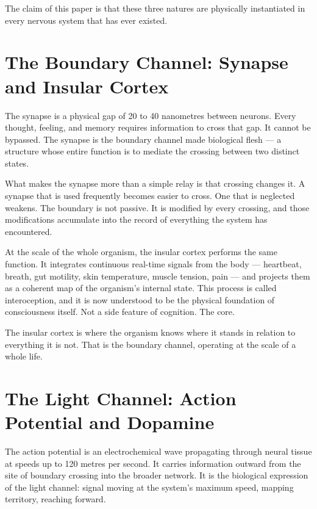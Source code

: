 \documentclass[12pt]{article}
\begin{document}
The claim of this paper is that these three natures are physically instantiated
in every nervous system that has ever existed.

\section{The Boundary Channel: Synapse and Insular Cortex}

The synapse is a physical gap of 20 to 40 nanometres between neurons. Every
thought, feeling, and memory requires information to cross that gap. It cannot
be bypassed. The synapse is the boundary channel made biological flesh --- a
structure whose entire function is to mediate the crossing between two distinct
states.

What makes the synapse more than a simple relay is that crossing changes it.
A synapse that is used frequently becomes easier to cross. One that is neglected
weakens. The boundary is not passive. It is modified by every crossing, and
those modifications accumulate into the record of everything the system has
encountered.

At the scale of the whole organism, the insular cortex performs the same
function. It integrates continuous real-time signals from the body --- heartbeat,
breath, gut motility, skin temperature, muscle tension, pain --- and projects
them as a coherent map of the organism's internal state. This process is called
interoception, and it is now understood to be the physical foundation of
consciousness itself. Not a side feature of cognition. The core.

The insular cortex is where the organism knows where it stands in relation to
everything it is not. That is the boundary channel, operating at the scale of a
whole life.

\section{The Light Channel: Action Potential and Dopamine}

The action potential is an electrochemical wave propagating through neural
tissue at speeds up to 120 metres per second. It carries information outward
from the site of boundary crossing into the broader network. It is the biological
expression of the light channel: signal moving at the system's maximum speed,
mapping territory, reaching forward.
\end{document}

